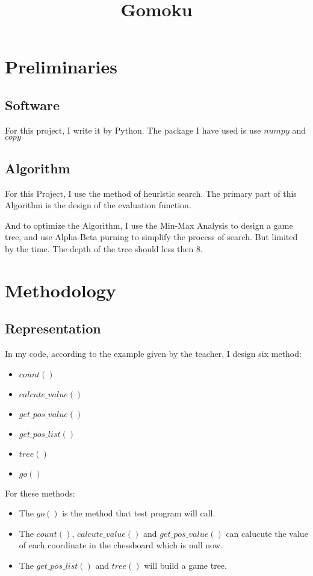 \documentclass[conference,compsoc]{IEEEtran}
\begin{document}
\title{Gomoku}



\author{
}

\maketitle
\IEEEpeerreviewmaketitle



\section{Preliminaries}

\subsection{Software}
For this project, I write it by Python. The package I have used is use $numpy$ and $copy$
\subsection{Algorithm}
For this Project, I use the method of heurlstlc search. The primary part of this Algorithm is the design of the 
evaluation function.  

And to optimize the Algorithm, I use the Min-Max Analysis to design a game tree, and use Alpha-Beta purning to simplify the process of search. 
But limited by the time. The depth of the tree should less then 8.

\section{Methodology}
\subsection{Representation}
In my code, according to the example given by the teacher, I design six method:  
\begin{itemize}
  \item $count()$
  \item $calcute\_value()$
  \item $get\_pos\_value()$
  \item $get\_pos\_list()$
  \item $tree()$
  \item $go()$
\end{itemize}
For these methods:
\begin{itemize}
  \item The $go()$ is the method that test program will call.
  \item The $count()$, $calcute\_value()$ and $get\_pos\_value()$ can calucute the value of each coordinate in the chessboard which is null now.
  \item The $get\_pos\_list()$ and $tree()$ will build a game tree.
\end{itemize}
\end{document}

